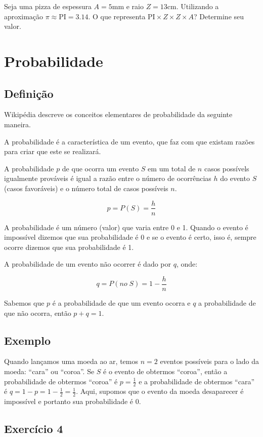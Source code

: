 Seja uma pizza de espessura $A = 5$mm e raio $Z = 13$cm.
Utilizando a aproximação $\pi \approx \mathrm{PI} = 3.14$.
O que representa $\mathrm{PI} \times Z \times Z \times A$?
Determine seu valor.

\section{Probabilidade}

\subsection*{Definição}

Wikipédia descreve os conceitos elementares de probabilidade da seguinte
maneira.

A probabilidade é a característica de um evento, que faz com que existam razões
para criar que este se realizará.

A probabilidade $p$ de que ocorra um evento $S$ em um total de $n$ casos
possívels igualmente prováveis é igual a razão entre o número de ocorrências $h$
do evento $S$ (casos favoráveis) e o número total de casos possíveis $n$.

$$
p=P\left(S\right)=\frac {h}{n}
$$

A probabilidade é um número (valor) que varia entre 0 e 1. Quando o evento é
impossível dizemos que sua probabilidade é 0 e se o evento é certo, isso é,
sempre ocorre dizemos que sua probabilidade é 1.

A probabilidade de um evento não ocorrer é dado por $q$, onde:

$$
q=P\left(no \; S\right)=1-\frac {h}{n}
$$

Sabemos que $p$ é a probabilidade de que um evento ocorra e $q$ a probabilidade
de que não ocorra, então $p + q = 1$.

\subsection*{Exemplo}

Quando lançamos uma moeda ao ar, temos $n = 2$ eventos possíveis para o lado da
moeda: ``cara'' ou ``coroa''. Se $S$ é o evento de obtermos ``coroa'', então a
probabilidade de obtermos ``coroa'' é $p = \frac{1}{2}$
e a probabilidade de obtermos ``cara'' é
$q = 1 - p = 1 - \frac{1}{2} = \frac{1}{2}$.
Aqui, supomos que o evento da moeda desaparecer é impossível e portanto sua
probabilidade é $0$.

\subsection*{Exercício 4}

